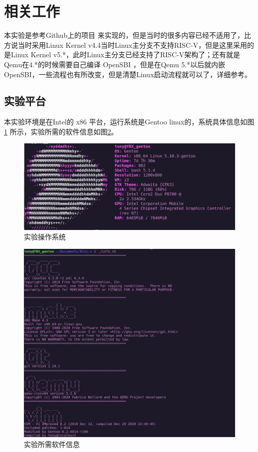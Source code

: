 \section{相关工作}
本实验是参考Github上的项目 \cite{BusyBear} 来实现的，但是当时的很多内容已经不适用了，比方说当时采用Linux Kernel v4.4当时Linux主分支不支持RISC-V，但是这里采用的是Linux Kernel v5.*，此时Linux主分支已经支持了RISC-V架构了；还有就是Qemu在4.*的时候需要自己编译 OpenSBI ，但是在Qemu 5.*以后就内嵌 OpenSBI，一些流程也有所改变，但是清楚Linux启动流程就可以了，详细参考\cite{从按下电源开始的一场接力赛}。

\subsection{实验平台}
本实验环境是在Intel的 x86 平台，运行系统是Gentoo linux的，系统具体信息如图\ref{fig:gentoo} 所示，实验所需的软件信息如图\ref{fig:info}。

\begin{figure}[htbp]
  \centering %
  \includegraphics[width=0.8 \textwidth]{figs/Process/gentoo_Logo.eps}
  \caption{实验操作系统}
  \label{fig:gentoo} %
\end{figure}

\begin{figure}[htbp]
  \centering %
  \includegraphics[width=1.0 \textwidth]{figs/Process/info.png}
  \caption{实验所需软件信息}
  \label{fig:info} %
\end{figure}

